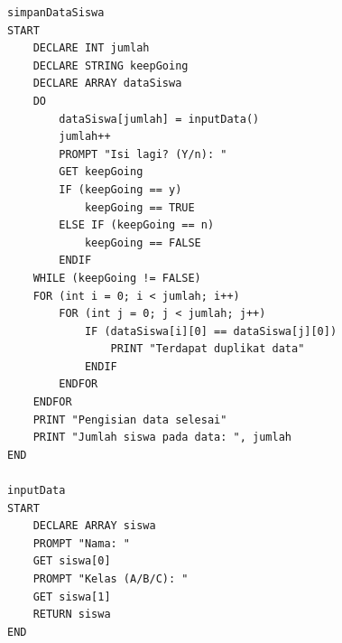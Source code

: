 \documentclass[
  11pt,
  answers  
]{exam}
\begin{document}
\begin{questions}
\begin{solution}
    \end{solution}
    \pagebreak
    \question
    \begin{solution}
      \begin{lstlisting}
simpanDataSiswa
START
	DECLARE INT jumlah
	DECLARE STRING keepGoing
	DECLARE ARRAY dataSiswa
	DO
		dataSiswa[jumlah] = inputData()
		jumlah++
		PROMPT "Isi lagi? (Y/n): "
		GET keepGoing
		IF (keepGoing == y)
			keepGoing == TRUE
		ELSE IF (keepGoing == n) 
			keepGoing == FALSE
		ENDIF
	WHILE (keepGoing != FALSE)
	FOR (int i = 0; i < jumlah; i++)
		FOR (int j = 0; j < jumlah; j++)
			IF (dataSiswa[i][0] == dataSiswa[j][0])
				PRINT "Terdapat duplikat data"
			ENDIF
		ENDFOR
	ENDFOR
	PRINT "Pengisian data selesai"
	PRINT "Jumlah siswa pada data: ", jumlah
END

inputData
START
	DECLARE ARRAY siswa
	PROMPT "Nama: "
	GET siswa[0]
	PROMPT "Kelas (A/B/C): "
	GET siswa[1]
	RETURN siswa 
END
      \end{lstlisting}
    \end{solution}
  \end{questions}
\end{document}
